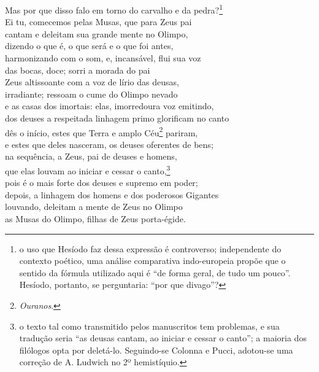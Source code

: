 \quad{}Mas por que disso falo em torno do carvalho e da pedra?\footnote{o uso que Hesíodo faz dessa expressão é controverso; independente do
contexto poético, uma análise comparativa indo-europeia propõe que o
sentido da fórmula utilizado aqui é ``de forma geral, de tudo um
pouco''. Hesíodo, portanto, se perguntaria: ``por que divago''?} \\
Ei tu, comecemos pelas Musas, que para Zeus pai\\
cantam e deleitam sua grande mente no Olimpo,\\
dizendo o que é, o que será e o que foi antes,\\
harmonizando com o som, e, incansável, flui sua voz\\
das bocas, doce; sorri a morada do pai \\
Zeus altissoante com a voz de lírio das deusas,\\
irradiante; ressoam o cume do Olimpo nevado\\
e as casas dos imortais: elas, imorredoura voz emitindo,\\
dos deuses a respeitada linhagem primo glorificam no canto\\
dês o início, estes que Terra e amplo Céu\footnote{\emph{Ouranos}.} pariram, \\
e estes que deles nasceram, os deuses oferentes de bens;\\
na sequência, a Zeus, pai de deuses e homens,\\
que elas louvam ao iniciar e cessar o canto,\footnote{o texto tal como transmitido pelos manuscritos tem problemas, e sua
tradução seria ``as deusas cantam, ao iniciar e cessar o canto''; a
maioria dos filólogos opta por deletá-lo. Seguindo-se Colonna e Pucci,
adotou-se uma correção de A. Ludwich no 2º hemistíquio.}\\
pois é o mais forte dos deuses e supremo em poder;\\
depois, a linhagem dos homens e dos poderosos Gigantes \\
louvando, deleitam a mente de Zeus no Olimpo\\
as Musas do Olimpo, filhas de Zeus porta-égide.

